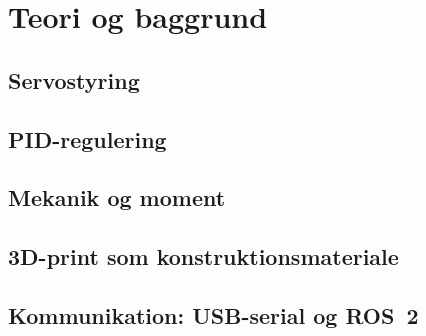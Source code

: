 \chapter{Teori og baggrund}
\label{ch:teori}


\section{Servostyring}

\section{PID-regulering}

\section{Mekanik og moment}

\section{3D-print som konstruktionsmateriale}

\section{Kommunikation: USB-serial og ROS~2}
